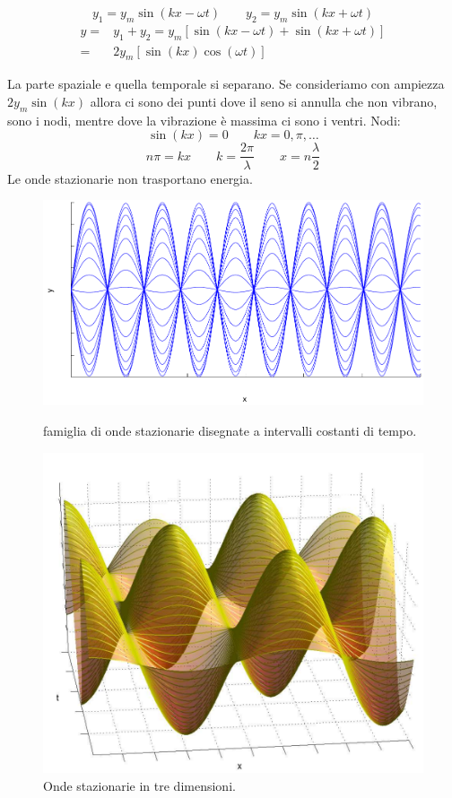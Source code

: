 \parbox[]{\textwidth}{
\[
y_1=y_m\sin\left(kx-\omega t\right)\qquad y_2=y_m\sin\left(kx+\omega t\right)
\]
\begin{align*}
y=&y_1+y_2=y_m\left[\sin\left(kx-\omega t\right)+\sin\left(kx+\omega t\right)\right]\\
=&2y_m\left[\sin\left(kx\right)\cos\left(\omega t\right)\right]
\end{align*}
}
La parte spaziale e quella temporale si separano. Se consideriamo con ampiezza $2y_m\sin\left(kx\right)$ allora ci sono dei punti dove il seno si annulla che non vibrano, sono i nodi, mentre dove la vibrazione è massima ci sono i ventri. Nodi:
\[\sin\left(kx\right)=0\qquad kx=0,\pi,\ldots\]
\[n\pi=kx\qquad k=\frac{2\pi}{\lambda}\qquad x=n\frac{\lambda}{2}\]
Le onde stazionarie non trasportano energia.
\begin{figure}[htbp]
   \centering
   \includegraphics[scale=0.5]{immagini/fisica1/stazionarie1}
   \caption{famiglia di onde stazionarie disegnate a intervalli costanti di tempo.}
   \includegraphics[scale=0.7]{immagini/fisica1/stazionarie2}
   \caption{Onde stazionarie in tre dimensioni.}
\end{figure}

